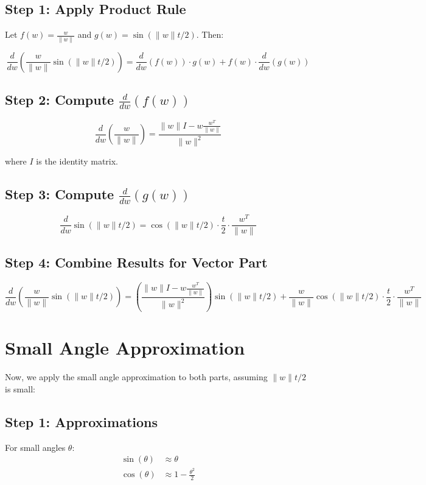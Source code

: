 \documentclass{article}
\begin{document}
	\subsection{Step 1: Apply Product Rule}

	Let $f(w) = \frac{w}{\|w\|}$ and $g(w) = \sin(\|w\| t/2)$. Then:

	$$\frac{d}{dw}\left(\frac{w}{\|w\|} \sin(\|w\| t/2)\right) = \frac{d}{dw}(f(w)) \cdot g(w) + f(w) \cdot \frac{d}{dw}(g(w))$$

	\subsection{Step 2: Compute $\frac{d}{dw}(f(w))$}

	$$\frac{d}{dw}\left(\frac{w}{\|w\|}\right) = \frac{\|w\|I - w\frac{w^T}{\|w\|}}{\|w\|^2}$$

	where $I$ is the identity matrix.

	\subsection{Step 3: Compute $\frac{d}{dw}(g(w))$}

	$$\frac{d}{dw}\sin(\|w\| t/2) = \cos(\|w\| t/2) \cdot \frac{t}{2} \cdot \frac{w^T}{\|w\|}$$

	\subsection{Step 4: Combine Results for Vector Part}

	$$\frac{d}{dw}\left(\frac{w}{\|w\|} \sin(\|w\| t/2)\right) = \left(\frac{\|w\|I - w\frac{w^T}{\|w\|}}{\|w\|^2}\right) \sin(\|w\| t/2) + \frac{w}{\|w\|} \cos(\|w\| t/2) \cdot \frac{t}{2} \cdot \frac{w^T}{\|w\|}$$

	\section{Small Angle Approximation}

	Now, we apply the small angle approximation to both parts, assuming $\|w\|t/2$ is small:

	\subsection{Step 1: Approximations}

	For small angles $\theta$:
	\begin{align*}
		\sin(\theta) &\approx \theta \\
		\cos(\theta) &\approx 1 - \frac{\theta^2}{2}
	\end{align*}
\end{document}
